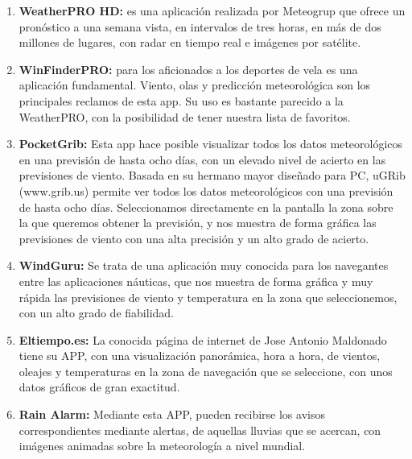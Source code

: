\begin{enumerate}
\item \textbf{WeatherPRO HD:} es una aplicación realizada por
  Meteogrup que ofrece un pronóstico a una semana vista, en intervalos
  de tres horas, en más de dos millones de lugares, con radar en
  tiempo real e imágenes por satélite.
\item \textbf{WinFinderPRO:} para los aficionados a los deportes de
  vela es una aplicación fundamental. Viento, olas y predicción
  meteorológica son los principales reclamos de esta app. Su uso es
  bastante parecido a la WeatherPRO, con la posibilidad de tener
  nuestra lista de favoritos.
\item \textbf{PocketGrib:} Esta app hace posible visualizar todos los
  datos meteorológicos en una previsión de hasta ocho días, con un
  elevado nivel de acierto en las previsiones de viento. Basada en su
  hermano mayor diseñado para PC, uGRib (www.grib.us) permite ver
  todos los datos meteorológicos con una previsión de hasta ocho
  días. Seleccionamos directamente en la pantalla la zona sobre la que
  queremos obtener la previsión, y nos muestra de forma gráfica las
  previsiones de viento con una alta precisión y un alto grado de
  acierto.
\item \textbf{WindGuru:} Se trata de una aplicación muy conocida para
  los navegantes entre las aplicaciones náuticas, que nos muestra de
  forma gráfica y muy rápida las previsiones de viento y temperatura
  en la zona que seleccionemos, con un alto grado de fiabilidad.
\item \textbf{Eltiempo.es:} La conocida página de internet de Jose
  Antonio Maldonado tiene su APP, con una visualización panorámica,
  hora a hora, de vientos, oleajes y temperaturas en la zona de
  navegación que se seleccione, con unos datos gráficos de gran
  exactitud.
\item \textbf{Rain Alarm:} Mediante esta APP, pueden recibirse los
  avisos correspondientes mediante alertas, de aquellas lluvias que se
  acercan, con imágenes animadas sobre la meteorología a nivel
  mundial.
\end{enumerate}

